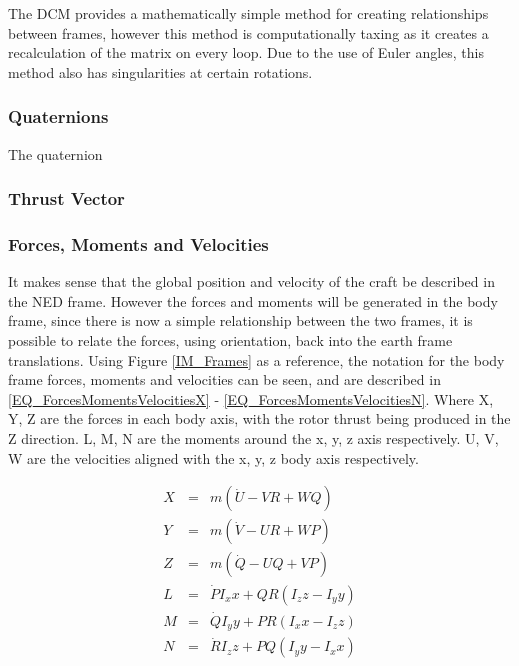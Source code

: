 		The DCM provides a mathematically simple method for creating relationships between frames, however this method is computationally taxing as it creates a recalculation of the matrix on every loop. Due to the use of Euler angles, this method also has singularities at certain rotations.
		
		\subsubsection{Quaternions}
		The quaternion \cite{Groekatthofer2012}
		
		\subsubsection{Thrust Vector}	
		
		\subsubsection{Forces, Moments and Velocities}
			
		It makes sense that the global position and velocity of the craft be described in the NED frame. However the forces and moments will be generated in the body frame, since there is now a simple relationship between the two frames, it is possible to relate the forces, using orientation, back into the earth frame translations. Using Figure \ref{IM_Frames} as a reference, the notation for the body frame forces, moments and velocities can be seen, and are described in \eqref{EQ_ForcesMomentsVelocitiesX} - \eqref{EQ_ForcesMomentsVelocitiesN}. Where X, Y, Z are the forces in each body axis, with the rotor thrust being produced in the Z direction. L, M, N are the moments around the x, y, z axis respectively. U, V, W are the velocities aligned with the x, y, z body axis respectively.
		
		\begin{eqnarray}
		X &=&  m(\dot{U} - VR + WQ)\label{EQ_ForcesMomentsVelocitiesX}\\
		Y &=&  m(\dot{V} - UR + WP)\label{EQ_ForcesMomentsVelocitiesY}\\	
		Z &=&  m(\dot{Q} - UQ + VP)\label{EQ_ForcesMomentsVelocitiesZ}\\
		L &=&  \dot{P}I_xx + QR(I_zz - I_yy)\label{EQ_ForcesMomentsVelocitiesL}\\
		M &=&  \dot{Q}I_yy + PR(I_xx - I_zz)\label{EQ_ForcesMomentsVelocitiesM}\\	
		N &=&  \dot{R}I_zz + PQ(I_yy - I_xx)\label{EQ_ForcesMomentsVelocitiesN}
	\end{eqnarray}
	

